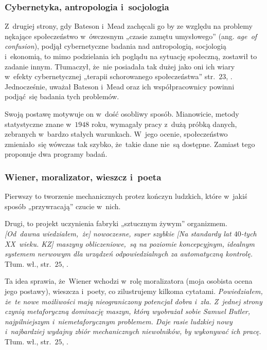 \documentclass[10pt,t]{beamer}
\begin{document}
\begin{frame}
  \frametitle{Cybernetyka, antropologia i~socjologia}


  Z~drugiej strony, gdy Bateson i~Mead zachęcali go by ze względu na
  problemy nękające społeczeństwo w~ówczesnym „czasie zamętu umysłowego”
  (ang. \textit{age~of confusion}), podjął cybernetyczne badania nad
  antropologią, socjologią i~ekonomią, to mimo podzielania ich poglądu
  na sytuację społeczną, zostawił to zadanie innym. Tłumaczył, że~nie
  posiadała tak dużej jako oni ich wiary w~efekty cybernetycznej „terapii
  schorowanego społeczeństwa” str.~$23$,
  \parencite{Wiener-Cybernetics-Second-edition-Pub-2016}.
  Jednocześnie, uważał Bateson i~Mead oraz ich współpracownicy powinni
  podjąć~się badania tych problemów.

  Swoją postawę motywuje on w~dość osobliwy sposób. Mianowicie, metody
  statystyczne znane w~$1948$ roku, wymagały pracy z~dużą próbką danych,
  zebranych w~bardzo stałych warunkach. W~jego ocenie, społeczeństwo
  zmieniało~się wówczas tak szybko, że~takie dane nie~są dostępne.
  Zamiast tego proponuje dwa programy badań.

\end{frame}





\begin{frame}
  \frametitle{Wiener, moralizator, wieszcz i~poeta}

  Pierwszy to tworzenie mechanicznych protez kończyn ludzkich, które
  w~jakiś sposób „przywracają” czucie w~nich.

  Drugi, to projekt uczynienia fabryki „sztucznym żywym” organizmem.
  \textit{[Od~dawna wiedziałem,~że] nowoczesne, super szybkie [Na
    standardy lat $40$-tych XX~wieku. KZ] maszyny obliczeniowe,~są
    na poziomie koncepcyjnym, idealnym systemem nerwowym dla urządzeń
    odpowiedzialnych za automatyczną kontrolę.} Tłum. wł., str.~$25$,
  \parencite{Wiener-Cybernetics-Second-edition-Pub-2016}.

  Ta idea sprawia, że~Wiener wchodzi w~rolę moralizatora (moja osobista
  ocena jego postawy), wieszcza i~poety, co zilustrujemy kilkoma cytatami.
  \textit{Powiedziałem, że~te nowe możliwości mają nieograniczony potencjał
    dobra i~zła. Z~jednej strony czynią metaforyczną dominację maszyn,
    którą wyobrażał sobie
    {Samuel Butler}, najpilniejszym i~niemetaforycznym problemem. Daje
    rasie ludzkiej nowy i~najbardziej wydajny zbiór mechanicznych
    niewolników, by wykonywać ich pracę.} Tłum. wł., str.~$25$,
  \parencite{Wiener-Cybernetics-Second-edition-Pub-2016}.

\end{frame}
\end{document}
